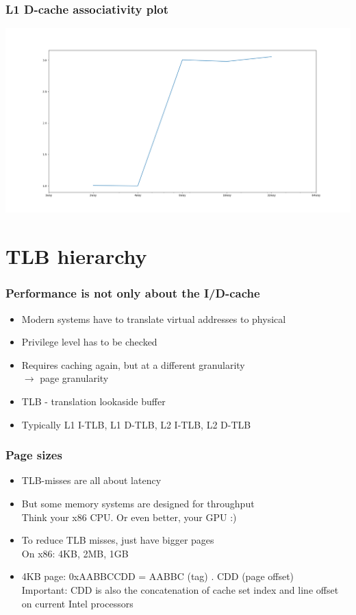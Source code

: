\documentclass{beamer}
\begin{document}
\begin{frame}
\frametitle{L1 D-cache associativity plot}
\includegraphics[scale=.25]{img/l1_d_assoc.png}
\end{frame}

\section{TLB hierarchy}

\begin{frame}
\frametitle{Performance is not only about the I/D-cache}
\begin{itemize}
\item Modern systems have to translate virtual addresses to physical
\item Privilege level has to be checked
\item Requires caching again, but at a different granularity\\
$\rightarrow$ page granularity
\item TLB - translation lookaside buffer
\item Typically L1 I-TLB, L1 D-TLB, L2 I-TLB, L2 D-TLB
\end{itemize}
\end{frame}

\begin{frame}
\frametitle{Page sizes}
\begin{itemize}
\item TLB-misses are all about latency
\item But some memory systems are designed for throughput\\
Think your x86 CPU. Or even better, your GPU :)
\item To reduce TLB misses, just have bigger pages\\
On x86: 4KB, 2MB, 1GB
\item 4KB page: 0xAABBCCDD = AABBC (tag) . CDD (page offset)\\
Important: CDD is also the concatenation of cache set index and line offset on current Intel processors\\
\end{itemize}
\end{frame}
\end{document}
